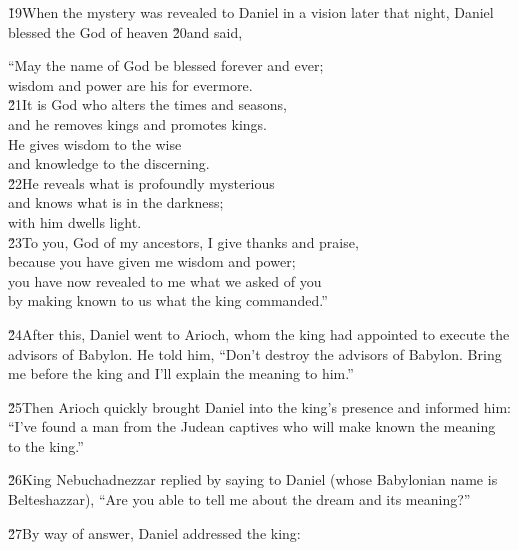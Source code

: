 \v{19}When the mystery was revealed to Daniel in a vision later that night, Daniel blessed the God of heaven \v{20}and said,

\begin{poetry}
\poeml ``May the name of God be blessed forever and ever; \\
\poemll    wisdom and power are his for evermore. \\
\poeml \v{21}It is God who alters the times and seasons, \\
\poemll    and he removes kings and promotes kings. \\
\poeml He gives wisdom to the wise \\
\poemll    and knowledge to the discerning. \\
\poeml \v{22}He reveals what is profoundly mysterious \\
\poemll    and knows what is in the darkness; \\
\poemlll       with him dwells light. \\
\poeml \v{23}To you, God of my ancestors, I give thanks and praise, \\
\poemll    because you have given me wisdom and power; \\
\poeml you have now revealed to me what we asked of you \\
\poemll    by making known to us what the king commanded.''
\end{poetry}

\v{24}After this, Daniel went to Arioch, whom the king had appointed to execute the advisors of Babylon. He told him, ``Don't destroy the advisors of Babylon. Bring me before the king and I'll explain the meaning to him.''

\v{25}Then Arioch quickly brought Daniel into the king's presence and informed him: ``I've found a man from the Judean captives who will make known the meaning to the king.''

\v{26}King Nebuchadnezzar replied by saying to Daniel (whose Babylonian name is Belteshazzar), ``Are you able to tell me about the dream and its meaning?''

\v{27}By way of answer, Daniel addressed the king:

